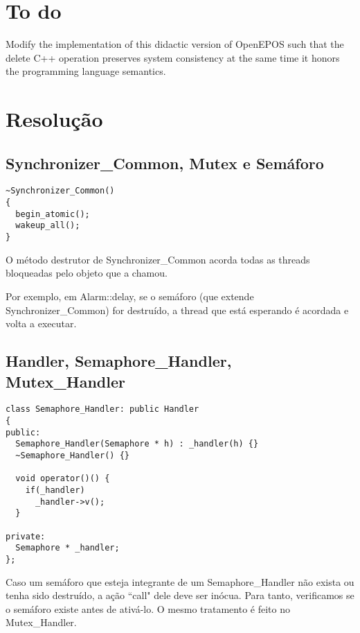 \documentclass[12pt]{relatorio}
\author{
Douglas Klein \\ 08132015
\and
João Marcus Alves \\ 07132067
\and
Maurílio Átila \\ 10100760
}
\begin{document}
\maketitle


\section{To do}

Modify the implementation of this didactic version of OpenEPOS such that the delete C++ operation preserves system consistency at the same time it honors the programming language semantics.

\newpage

\section{Resolução}
\subsection{Synchronizer\_Common, Mutex e Semáforo}

\begin{lstlisting}
~Synchronizer_Common()
{
  begin_atomic();
  wakeup_all();
}
\end{lstlisting}

O método destrutor de Synchronizer\_Common acorda todas as threads bloqueadas pelo objeto que a chamou.

Por exemplo, em Alarm::delay, se o semáforo (que extende Synchronizer\_Common) for destruído, a thread que está esperando é acordada e volta a executar.

\subsection{Handler, Semaphore\_Handler, Mutex\_Handler}

\begin{lstlisting}
class Semaphore_Handler: public Handler
{
public:
  Semaphore_Handler(Semaphore * h) : _handler(h) {}
  ~Semaphore_Handler() {}

  void operator()() {
    if(_handler)
      _handler->v();
  }

private:
  Semaphore * _handler;
};
\end{lstlisting}

Caso um semáforo que esteja integrante de um Semaphore\_Handler não exista ou tenha sido destruído, a ação ``call" dele deve ser inócua. Para tanto, verificamos se o semáforo existe antes de ativá-lo. O mesmo tratamento é feito no Mutex\_Handler.
\end{document}
